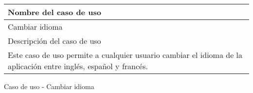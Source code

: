 \begin{identificacionCasoDeUso}
	\begin{tabular} { | p{17cm} |}

		\hline
		Nombre del caso de uso                                                                                           \\ \hline
		Cambiar idioma                                                                                                   \\ \hline
		Descripción del caso de uso                                                                                      \\ \hline
		Este caso de uso permite a cualquier usuario cambiar el idioma de la aplicación entre inglés, español y francés. \\ \hline
	\end{tabular}
	\caption{Caso de uso - Cambiar idioma}
\end{identificacionCasoDeUso}